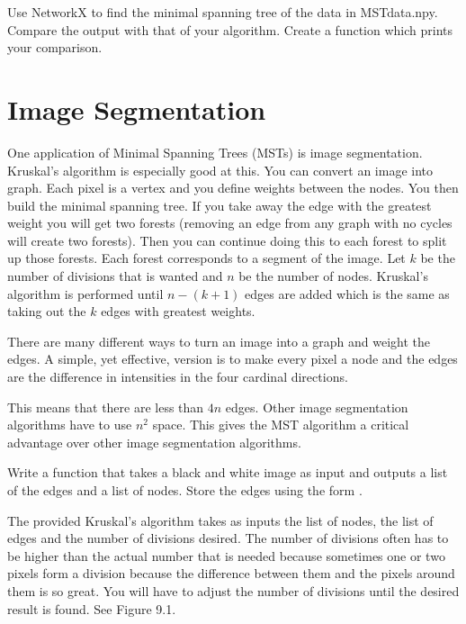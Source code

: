 \begin{problem}
Use NetworkX to find the minimal spanning tree of the data in MSTdata.npy.
Compare the output with that of your algorithm.
Create a function which prints your comparison.
\end{problem}


\section*{Image Segmentation}


One application of Minimal Spanning Trees (MSTs) is image segmentation.
Kruskal's algorithm is especially good at this.
You can convert an image into graph. Each pixel is a vertex and you define weights between the nodes. You then build the minimal spanning tree. If you take away the edge with the greatest weight you will get two forests (removing an edge from any graph with no cycles will create two forests). Then you can continue doing this to each forest to split up those forests. Each forest corresponds to a segment of the image.
Let $k$ be the number of divisions that is wanted and $n$ be the number of nodes.
Kruskal's algorithm is performed until $n-(k+1)$ edges are added which is the same as taking out the $k$ edges with greatest weights.

There are many different ways to turn an image into a graph and weight the edges.
A simple, yet effective, version is to make every pixel a node and the edges are the difference in intensities in the four cardinal directions.


This means that there are less than $4n$ edges.
Other image segmentation algorithms have to use $n^2$ space.
This gives the MST algorithm a critical advantage over other image segmentation algorithms.

\begin{problem}
Write a function that takes a black and white image as input and outputs a list of the edges and a list of nodes.
Store the edges using the form .
\end{problem}

The provided Kruskal's algorithm takes as inputs the list of nodes, the list of edges and the number of divisions desired.
The number of divisions often has to be higher than the actual number that is needed because sometimes one or two pixels form a division because the difference between them and the pixels around them is so great.
You will have to adjust the number of divisions until the desired result is found.  See Figure 9.1.

